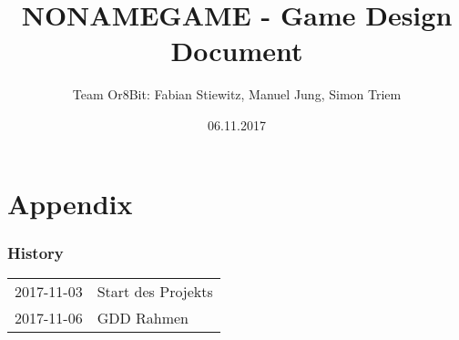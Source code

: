 \documentclass[a4paper,12pt]{article}
\title{NONAMEGAME - Game Design Document}
\author{Team Or8Bit: Fabian Stiewitz, Manuel Jung, Simon Triem}
\date{06.11.2017}
\begin{document}
\maketitle
\newpage
\tableofcontents
\newpage
\listoffigures
\newpage









\appendix
\part{Appendix}

\section{History}
\begin{tabularx}{\textwidth}{ l X }
  2017-11-03 & Start des Projekts \\
  2017-11-06 & GDD Rahmen \\
\end{tabularx}
\newpage
\printindex
\end{document}

